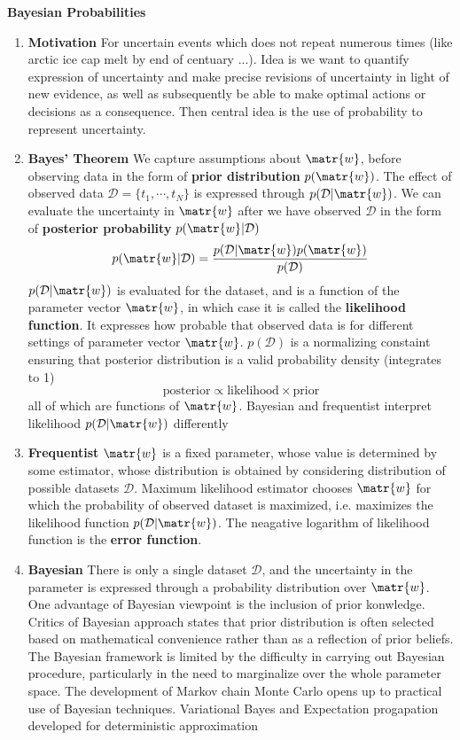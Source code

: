 \documentclass[11pt]{article}
\begin{document}
\begin{defn*}
    \textbf{Bayesian Probabilities}
    \begin{enumerate}
        \item \textbf{Motivation} For uncertain events which does not repeat numerous times (like arctic ice cap melt by end of centuary ...). Idea is we want to quantify expression of uncertainty and make precise revisions of uncertainty in light of new evidence, as well as subsequently be able to make optimal actions or decisions as a consequence. Then central idea is the use of probability to represent uncertainty. 
        \item \textbf{Bayes' Theorem} We capture assumptions about $\matr{w}$, before observing data in the form of \textbf{prior distribution} $p(\matr{w})$. The effect of observed data $\mathcal{D}=\{t_1,\cdots,t_N\}$ is expressed through $p(\mathcal{D}|\matr{w})$. We can evaluate the uncertainty in $\matr{w}$ after we have observed $\mathcal{D}$ in the form of \textbf{posterior probability} $p(\matr{w}|\mathcal{D})$
        \[
            p(\matr{w}|\mathcal{D}) = 
            \frac{p(\mathcal{D}|\matr{w}) p(\matr{w})}{p(\mathcal{D})} 
        \]
        $p(\mathcal{D}|\matr{w})$ is evaluated for the dataset, and is a function of the parameter vector $\matr{w}$, in which case it is called the \textbf{likelihood function}. It expresses how probable that observed data is for different settings of parameter vector $\matr{w}$. $p(\mathcal{D})$ is a normalizing constaint ensuring that posterior distribution is a valid probability density (integrates to 1)
        \[
            \text{posterior} \propto \text{likelihood}\times \text{prior}    
        \]
        all of which are functions of $\matr{w}$. Bayesian and frequentist interpret likelihood $p(\mathcal{D}|\matr{w})$ differently 
        \item \textbf{Frequentist} $\matr{w}$ is a fixed parameter, whose value is determined by some estimator, whose distribution is obtained by considering distribution of possible datasets $\mathcal{D}$. Maximum likelihood estimator chooses $\matr{w}$ for which the probability of observed dataset is maximized, i.e. maximizes the likelihood function $p(\mathcal{D}|\matr{w})$. The neagative logarithm of likelihood function is the \textbf{error function}.
        \item \textbf{Bayesian} There is only a single dataset $\mathcal{D}$, and the uncertainty in the parameter is expressed through a probability distribution over $\matr{w}$. One advantage of Bayesian viewpoint is the inclusion of prior konwledge. Critics of Bayesian approach states that prior distribution is often selected based on mathematical convenience rather than as a reflection of prior beliefs. The Bayesian framework is limited by the difficulty in carrying out Bayesian procedure, particularly in the need to marginalize over the whole parameter space. The development of Markov chain Monte Carlo opens up to practical use of Bayesian techniques. Variational Bayes and Expectation progapation developed for deterministic approximation
    \end{enumerate}
\end{defn*}
\end{document}
